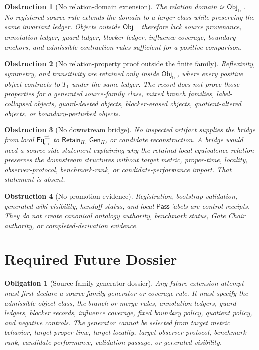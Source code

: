 \documentclass[11pt]{article}
\newcommand{\EqTri}{\mathsf{Eq}_{\mathrm{src}}^{\mathrm{tri}}}
\newcommand{\ObjTri}{\mathsf{Obj}_{\mathrm{tri}}}
\newcommand{\RetainH}{\mathsf{Retain}_{H}}
\newcommand{\GenH}{\mathsf{Gen}_{H}}
\newcommand{\Pass}{\mathsf{Pass}}
\newtheorem{obstruction}{Obstruction}
\newtheorem{obligation}{Obligation}
\begin{document}
\begin{obstruction}[No relation-domain extension]
The relation domain is \(\ObjTri\). No registered source rule extends
the domain to a larger class while preserving the same invariant ledger.
Objects outside \(\ObjTri\) therefore lack source provenance,
annotation ledger, guard ledger, blocker ledger, influence coverage,
boundary anchors, and admissible contraction rules sufficient for a
positive comparison.
\end{obstruction}

\begin{obstruction}[No relation-property proof outside the finite family]
Reflexivity, symmetry, and transitivity are retained only inside
\(\ObjTri\), where every positive object contracts to \(T_{1}\) under
the same ledger. The record does not prove those properties for a
generated source-family class, mixed branch families, label-collapsed
objects, guard-deleted objects, blocker-erased objects, quotient-altered
objects, or boundary-perturbed objects.
\end{obstruction}

\begin{obstruction}[No downstream bridge]
No inspected artifact supplies the bridge from local \(\EqTri\) to
\(\RetainH\), \(\GenH\), or candidate reconstruction. A bridge would
need a source-side statement explaining why the retained local
equivalence relation preserves the downstream structures without target
metric, proper-time, locality, observer-protocol, benchmark-rank, or
candidate-performance import. That statement is absent.
\end{obstruction}

\begin{obstruction}[No promotion evidence]
Registration, bootstrap validation, generated wiki visibility, handoff
status, and local \(\Pass\) labels are control receipts. They do not
create canonical ontology authority, benchmark status, Gate Chair
authority, or completed-derivation evidence.
\end{obstruction}

\section{Required Future Dossier}

\begin{obligation}[Source-family generator dossier]
Any future extension attempt must first declare a source-family
generator or coverage rule. It must specify the admissible object class,
the branch or merge rules, annotation ledgers, guard ledgers, blocker
records, influence coverage, fixed boundary policy, quotient policy, and
negative controls. The generator cannot be selected from target metric
behavior, target proper time, target locality, target observer protocol,
benchmark rank, candidate performance, validation passage, or generated
visibility.
\end{obligation}
\end{document}
